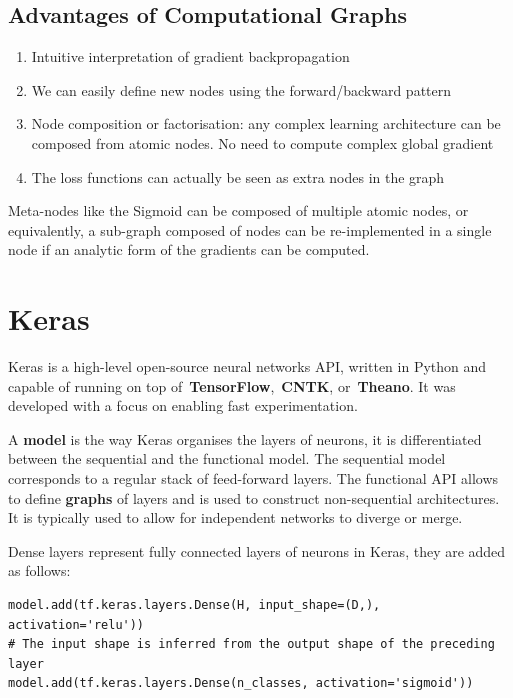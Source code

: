 \documentclass[11pt]{article}
\begin{document}
\subsection{Advantages of Computational Graphs}
\begin{enumerate}
	\item Intuitive interpretation of gradient backpropagation
	\item We can easily define new nodes using the forward/backward pattern
	\item Node composition or factorisation: any complex learning architecture can be composed from atomic nodes. No need to compute complex global gradient
	\item The loss functions can actually be seen as extra nodes in the graph
\end{enumerate}

Meta-nodes like the Sigmoid can be composed of multiple atomic nodes, or equivalently, a sub-graph composed of nodes can be re-implemented in a single node if an analytic form of the gradients can be computed.

\section{Keras}
Keras is a high-level open-source neural networks API, written in Python and capable of running on top of \textbf{TensorFlow}, \textbf{CNTK}, or \textbf{Theano}. It was developed with a focus on enabling fast experimentation.

A \textbf{model} is the way Keras organises the layers of neurons, it is differentiated between the sequential and the functional model. The sequential model corresponds to a regular stack of feed-forward layers. The functional API allows to define \textbf{graphs} of layers and is used to construct non-sequential architectures. It is typically used to allow for independent networks to diverge or merge.

Dense layers represent fully connected layers of neurons in Keras, they are added as follows:
\begin{verbatim}
model.add(tf.keras.layers.Dense(H, input_shape=(D,), activation='relu'))
# The input shape is inferred from the output shape of the preceding layer
model.add(tf.keras.layers.Dense(n_classes, activation='sigmoid'))
\end{verbatim}
\end{document}
